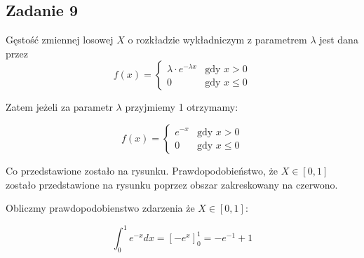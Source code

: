 \subsection{Zadanie 9}


Gęstość zmiennej losowej $X$ o rozkładzie wykładniczym z parametrem $\lambda$ jest dana przez 
$$
f(x) = \left\{ \begin{array}{ll}
\lambda \cdot e^{-\lambda x} & \textrm{gdy $x > 0$}\\
0 & \textrm{gdy $x \leq 0$}
\end{array} \right.
$$

Zatem jeżeli za parametr  $\lambda$  przyjmiemy 1 otrzymamy:

$$
f(x) = \left\{ \begin{array}{ll}
 e^{- x} & \textrm{gdy $x > 0$}\\
0 & \textrm{gdy $x \leq 0$}
\end{array} \right.
$$
  
Co przedstawione zostało na rysunku. Prawdopodobieństwo, że  $X \in [0,1]$ zostało przedstawione na rysunku poprzez obszar zakreskowany na czerwono.

Obliczmy prawdopodobienstwo zdarzenia że $X \in [0,1]$:

$$
\int_{0}^{1} e^{- x} dx = [-e^x]_{0}^{1} = -e^{-1} + 1
$$
